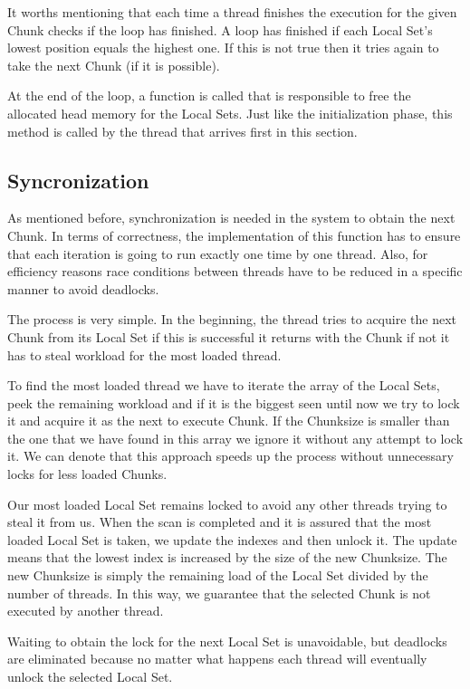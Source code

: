 \documentclass[12pt,a4paper]{article}
\begin{document}
It worths mentioning that each time a thread finishes the execution for the given Chunk checks if the loop has finished. A loop has finished if each Local Set's lowest position equals the highest one. If this is not true then it tries again to take the next Chunk (if it is possible).

At the end of the loop, a function is called that is responsible to free the allocated head memory for the Local Sets. Just like the initialization phase, this method is called by the thread that arrives first in this section.

\subsection{Syncronization}

As mentioned before, synchronization is needed in the system to obtain the next Chunk. In terms of correctness, the implementation of this function has to ensure that each iteration is going to run exactly one time by one thread. Also, for efficiency reasons race conditions between threads have to be reduced in a specific manner to avoid deadlocks.

The process is very simple. In the beginning, the thread tries to acquire the next Chunk from its Local Set if this is successful it returns with the Chunk if not it has to steal workload for the most loaded thread.

To find the most loaded thread we have to iterate the array of the Local Sets, peek the remaining workload and if it is the biggest seen until now we try to lock it and acquire it as the next to execute Chunk. If the Chunksize is smaller than the one that we have found in this array we ignore it without any attempt to lock it. We can denote that this approach speeds up the process without unnecessary locks for less loaded Chunks. 

Our most loaded Local Set remains locked to avoid any other threads trying to steal it from us. When the scan is completed and it is assured that the most loaded Local Set is taken, we update the indexes and then unlock it. The update means that the lowest index is increased by the size of the new Chunksize. The new Chunksize is simply the remaining load of the Local Set divided by the number of threads. In this way, we guarantee that the selected Chunk is not executed by another thread. 

Waiting to obtain the lock for the next Local Set is unavoidable, but deadlocks are eliminated because no matter what happens each thread will eventually unlock the selected Local Set.
\end{document}
